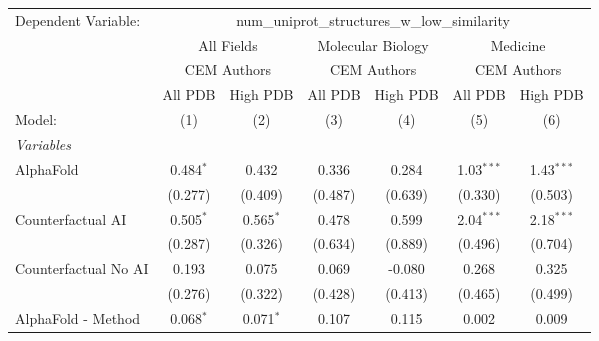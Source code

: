 \begingroup
\centering
\begin{tabular}{lcccccc}
   \tabularnewline \midrule \midrule
   Dependent Variable: & \multicolumn{6}{c}{num\_uniprot\_structures\_w\_low\_similarity}\\
 & \multicolumn{2}{c}{All Fields} & \multicolumn{2}{c}{Molecular Biology} & \multicolumn{2}{c}{Medicine} \\
\cmidrule(lr){2-3} \cmidrule(lr){4-5} \cmidrule(lr){6-7}
 & \multicolumn{2}{c}{CEM Authors} & \multicolumn{2}{c}{CEM Authors} & \multicolumn{2}{c}{CEM Authors} \\
\cmidrule(lr){2-3} \cmidrule(lr){4-5} \cmidrule(lr){6-7}
 & \multicolumn{1}{c}{All PDB} & \multicolumn{1}{c}{High PDB} & \multicolumn{1}{c}{All PDB} & \multicolumn{1}{c}{High PDB} & \multicolumn{1}{c}{All PDB} & \multicolumn{1}{c}{High PDB} \\
\cmidrule(lr){2-2} \cmidrule(lr){3-3} \cmidrule(lr){4-4} \cmidrule(lr){5-5} \cmidrule(lr){6-6} \cmidrule(lr){7-7}
   Model:                                                     & (1)          & (2)           & (3)           & (4)           & (5)           & (6)\\  
   \midrule
   \emph{Variables}\\
   AlphaFold                                                  & 0.484$^{*}$  & 0.432         & 0.336         & 0.284         & 1.03$^{***}$  & 1.43$^{***}$\\   
                                                              & (0.277)      & (0.409)       & (0.487)       & (0.639)       & (0.330)       & (0.503)\\   
   Counterfactual AI                                          & 0.505$^{*}$  & 0.565$^{*}$   & 0.478         & 0.599         & 2.04$^{***}$  & 2.18$^{***}$\\   
                                                              & (0.287)      & (0.326)       & (0.634)       & (0.889)       & (0.496)       & (0.704)\\   
   Counterfactual No AI                                       & 0.193        & 0.075         & 0.069         & -0.080        & 0.268         & 0.325\\   
                                                              & (0.276)      & (0.322)       & (0.428)       & (0.413)       & (0.465)       & (0.499)\\   
   AlphaFold - Method                                         & 0.068$^{*}$  & 0.071$^{*}$   & 0.107         & 0.115         & 0.002         & 0.009\\   

\end{tabular}
